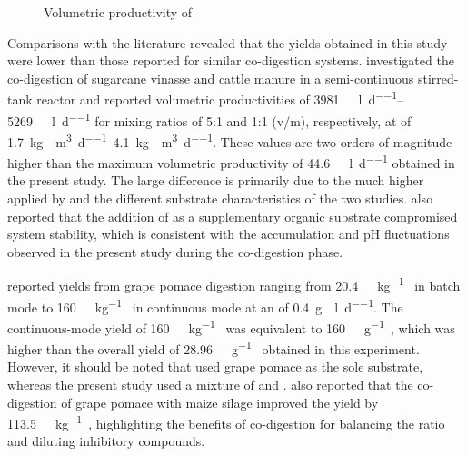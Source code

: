 \documentclass[12pt, a4paper, oneside]{report}
\begin{document}
\begin{figure}[H]
    \caption{Volumetric productivity of }
    \label{graph:volumetric-productivity-ch4}
\end{figure}

\endgroup

Comparisons with the literature revealed that the  yields obtained in this study were lower than those reported for similar co-digestion systems. \textcite{aguiar2026} investigated the co-digestion of sugarcane vinasse and cattle manure in a semi-continuous stirred-tank reactor and reported volumetric  productivities of \qtyrange{3981}{5269}{\nml\CH\per\litre\per\day} for mixing ratios of 5:1 and 1:1 (v/m), respectively, at  of \qtyrange{1.7}{4.1}{\kg\VS\per\cubic\metre\per\day}. These values are two orders of magnitude higher than the maximum volumetric productivity of \qty{44.6}{\nml\CH\per\litre\per\day} obtained in the present study. The large difference is primarily due to the much higher  applied by \textcite{aguiar2026} and the different substrate characteristics of the two studies. \textcite{aguiar2026} also reported that the addition of  as a supplementary organic substrate compromised system stability, which is consistent with the  accumulation and pH fluctuations observed in the present study during the co-digestion phase.

\textcite{longanesi2016} reported  yields from grape pomace digestion ranging from \qty{20.4}{\NL\CH\per\kg\VS} in batch mode to \qty{160}{\NL\CH\per\kg\VS} in continuous mode at an  of \qty{0.4}{\g\VS\per\litre\per\day}. The continuous-mode yield of \qty{160}{\NL\CH\per\kg\VS} was equivalent to \qty{160}{\nml\CH\per\gram\VS}, which was higher than the overall yield of \qty{28.96}{\nml\CH\per\gram\VSfed} obtained in this experiment. However, it should be noted that \textcite{longanesi2016} used grape pomace as the sole substrate, whereas the present study used a mixture of  and . \textcite{longanesi2016} also reported that the co-digestion of grape pomace with maize silage improved the  yield by \qty{113.5}{\NL\CH\per\kg\VS}, highlighting the benefits of co-digestion for balancing the  ratio and diluting inhibitory compounds.
\end{document}
